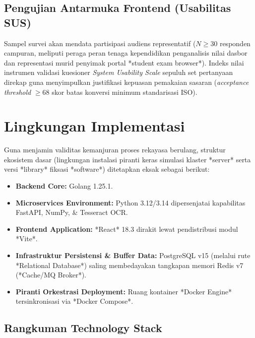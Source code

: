 \subsection{Pengujian Antarmuka Frontend (Usabilitas SUS)}
Sampel survei akan mendata partisipasi audiens representatif ($N \geq 30$ responden campuran, meliputi peraga peran tenaga kependidikan penganalisis nilai dasbor dan representasi murid penyimak portal *student exam browser*). Indeks nilai instrumen validasi kuesioner \textit{System Usability Scale} sepuluh set pertanyaan direkap guna menyimpulkan justifikasi kepuasan pemakaian sasaran (\textit{acceptance threshold} $\geq 68$ skor batas konversi minimum standarisasi ISO).

\section{Lingkungan Implementasi}

Guna menjamin validitas kemanjuran proses rekayasa berulang, struktur ekosistem dasar (lingkungan instalasi piranti keras simulasi klaster *server* serta versi *library* fiksasi *software*) ditetapkan eksak sebagai berikut:
\begin{itemize}
	\item \textbf{Backend Core:} Golang 1.25.1.
	\item \textbf{Microservices Environment:} Python 3.12/3.14 dipersenjatai kapabilitas FastAPI, NumPy, \& Tesseract OCR.
	\item \textbf{Frontend Application:} *React* 18.3 dirakit lewat pendistribusi modul *Vite*.
	\item \textbf{Infrastruktur Persistensi \& Buffer Data:} PostgreSQL v15 (melalui rute *Relational Database*) saling membedayakan tangkapan memori Redis v7 (*Cache/MQ Broker*).
	\item \textbf{Piranti Orkestrasi Deployment:} Ruang kontainer *Docker Engine* tersinkronisasi via *Docker Compose*.
\end{itemize}

\subsection{Rangkuman Technology Stack}

